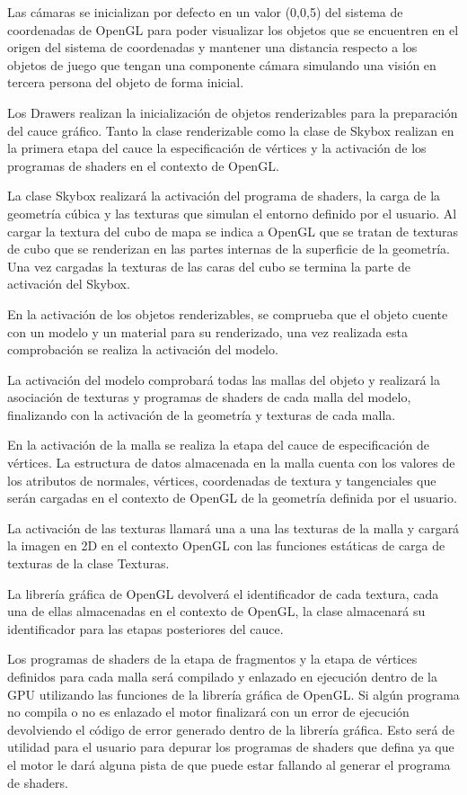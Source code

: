 \documentclass[a4paper, 17pt]{book}
\begin{document}
Las cámaras se inicializan por defecto en un valor (0,0,5) del sistema de coordenadas de OpenGL para poder visualizar los objetos que
se encuentren en el origen del sistema de coordenadas y mantener una distancia respecto a los objetos de juego que tengan una componente
cámara simulando una visión en tercera persona del objeto de forma inicial.

Los Drawers realizan la inicialización de objetos renderizables para la preparación del cauce gráfico. Tanto la clase renderizable
como la clase de Skybox realizan en la primera etapa del cauce la especificación de vértices y la activación de los programas de
shaders en el contexto de OpenGL.

La clase Skybox realizará la activación del programa de shaders, la carga de la geometría cúbica y las texturas que simulan el entorno
definido por el usuario. Al cargar la textura del cubo de mapa se indica a OpenGL que se tratan de texturas de cubo que se renderizan
en las partes internas de la superficie de la geometría. Una vez cargadas la texturas de las caras del cubo se termina la parte de
activación del Skybox.

En la activación de los objetos renderizables, se comprueba que el objeto cuente con un modelo y un material para su renderizado,
una vez realizada esta comprobación se realiza la activación del modelo. 

La activación del modelo comprobará todas las mallas del objeto y realizará la asociación de texturas y programas de shaders de cada
malla del modelo, finalizando con la activación de la geometría y texturas de cada malla.

En la activación de la malla se realiza la etapa del cauce de especificación de vértices. La estructura de datos almacenada en la malla
cuenta con los valores de los atributos de normales, vértices, coordenadas de textura y tangenciales que serán cargadas en el contexto
de OpenGL de la geometría definida por el usuario. 

La activación de las texturas llamará una a una las texturas de la malla y cargará la imagen en 2D en el contexto OpenGL con las
funciones estáticas de carga de texturas de la clase Texturas. 

La librería gráfica de OpenGL devolverá el identificador de cada textura, cada una de ellas almacenadas en el contexto de OpenGL,
la clase almacenará su identificador para las etapas posteriores del cauce.

Los programas de shaders de la etapa de fragmentos y la etapa de vértices definidos para cada malla será compilado y enlazado en
ejecución dentro de la GPU utilizando las funciones de la librería gráfica de OpenGL. Si algún programa no compila o no es enlazado
el motor finalizará con un error de ejecución devolviendo el código de error generado dentro de la librería gráfica. Esto será de
utilidad para el usuario para depurar los programas de shaders que defina ya que el motor le dará alguna pista de que puede estar
fallando al generar el programa de shaders.
\end{document}
